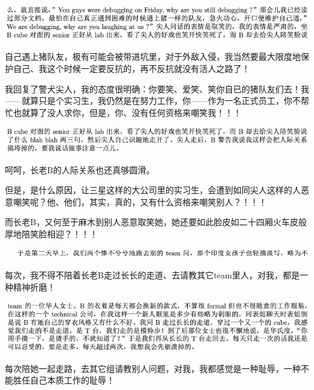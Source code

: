 \documentclass[9pt, b5paper]{article}
\begin{document}
\begin{center}
\includegraphics[width=.9\linewidth]{./pic/backups_plans_20210507_132434.png}
\end{center}

自己遇上猪队友，极有可能会被带进坑里，对于外敌入侵，我当然要最大限度地保护自己、我这个时候一定要反抗的，再不反抗就没有活人之路了！

我回复了警犬尖人，我的态度很明确：你要笑、爱笑、笑你自已的猪队友们去！我——就算只是个实习生，我仍然是在努力工作，你——作为一名正式员工，你不帮忙也就算了没人求你，但是，你、没有任何资格来嘲笑我！！！

\begin{center}
\includegraphics[width=.9\linewidth]{./pic/backups_plans_20210507_133135.png}
\end{center}

呵呵，长老B的人际关系也还真够圆滑。

但是，是什么原因，让三星这样的大公司里的实习生，会遭到如同尖人这样的人恶意嘲笑呢？他、他们，其实，真的，又有什么资格来嘲笑别人？！！！

而长老B，又何至于麻木到别人恶意取笑她，她还要如此脸皮如二十四厢火车皮般厚地陪笑脸相迎？！！！

\begin{center}
\includegraphics[width=.9\linewidth]{./pic/backups_plans_20210507_133617.png}
\end{center}

每次，我不得不陪着长老B走过长长的走道、去请教其它team里人，对我，都是一种精神折磨！

\begin{center}
\includegraphics[width=.9\linewidth]{./pic/backups_plans_20210507_133810.png}
\end{center}

每次陪她一起走路，去其它组请教别人问题，对我，我都感觉是一种耻辱，一种不能胜任自己本质工作的耻辱！
\end{document}
